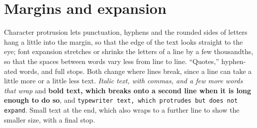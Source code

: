 \documentclass[11pt]{article}
\begin{document}
\section{Margins and expansion}
Character protrusion lets punctuation, hyphens and the rounded sides of letters hang a
little into the margin, so that the edge of the text looks straight to the eye; font
expansion stretches or shrinks the letters of a line by a few thousandths, so that the
spaces between words vary less from line to line. ``Quotes,'' hyphen-ated words, and
full stops. Both change where lines break, since a line can take a little more or a
little less text. \textit{Italic text, with commas, and a few more words that wrap} and
\textbf{bold text, which breaks onto a second line when it is long enough to do so}, and
\texttt{typewriter text, which protrudes but does not expand}. \small Small text at the
end, which also wraps to a further line to show the smaller size, with a final stop.
\end{document}
